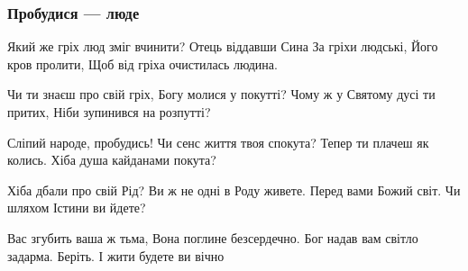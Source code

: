  
 
 

\subsubsection{Пробудися — люде}

Який же гріх люд зміг вчинити?
Отець віддавши Сина
За гріхи людські, Його кров пролити,
Щоб від гріха очистилась людина.

Чи ти знаєш про свій гріх,
Богу молися у покутті?
Чому ж у Святому дусі ти притих,
Ніби зупинився на розпутті?

Сліпий народе, пробудись!
Чи сенс життя твоя спокута?
Тепер ти плачеш як колись.
Хіба душа кайданами покута?

Хіба дбали про свій Рід?
Ви ж не одні в Роду живете.
Перед вами Божий світ.
Чи шляхом Істини ви йдете?

Вас згубить ваша ж тьма,
Вона поглине безсердечно.
Бог надав вам світло задарма.
Беріть. І жити будете ви вічно
